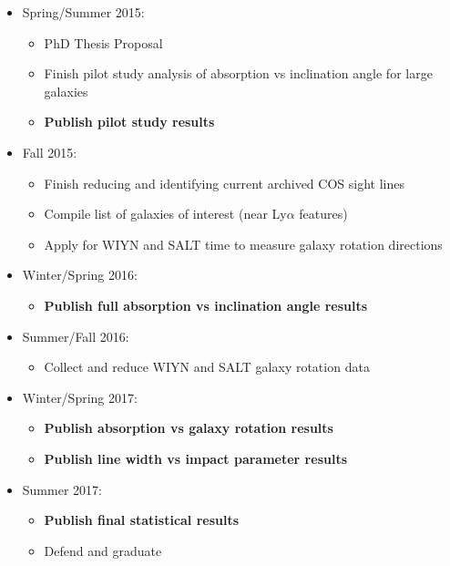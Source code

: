 \documentclass[iop]{emulateapj-rtx4}
\begin{document}
\begin{itemize}
\item{Spring/Summer 2015:}
\begin{itemize}
\item PhD Thesis Proposal
\item Finish pilot study analysis of absorption vs inclination angle for large galaxies
\item \textbf{Publish pilot study results}
\end{itemize}

\item{Fall 2015:}
\begin{itemize}
\item Finish reducing and identifying current archived COS sight lines
\item Compile list of galaxies of interest (near Ly$\alpha$ features)
\item Apply for WIYN and SALT time to measure galaxy rotation directions
\end{itemize}

\item{Winter/Spring 2016:}
\begin{itemize}
\item \textbf{Publish full absorption vs inclination angle results}
\end{itemize}

\item{Summer/Fall 2016:}
\begin{itemize}
\item Collect and reduce WIYN and SALT galaxy rotation data
\end{itemize}

\item{Winter/Spring 2017:}
\begin{itemize}
\item \textbf{Publish absorption vs galaxy rotation results}
\item \textbf{Publish line width vs impact parameter results}
\end{itemize}

\item{Summer 2017:}
\begin{itemize}
\item \textbf{Publish final statistical results}
\item Defend and graduate
\end{itemize}

\end{itemize}
\end{document}
